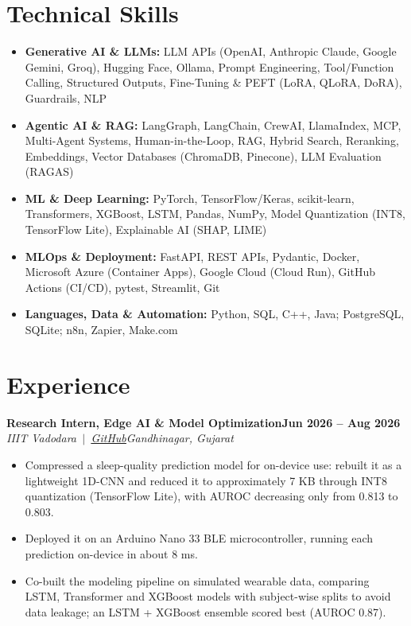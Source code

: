 \documentclass[10pt,a4paper]{article}
\newcommand{\entry}[4]{%
  \textbf{#1}\hfill\textbf{#2}\\
  \textit{#3}\hfill\textit{#4}\par}
\newcommand{\link}[2]{\href{#1}{\color{accent}\underline{#2}}}
\begin{document}
\section{Technical Skills}
\begin{itemize}[label={},leftmargin=0pt,itemsep=1pt]
  \item \textbf{Generative AI \& LLMs:} LLM APIs (OpenAI, Anthropic Claude, Google Gemini, Groq), Hugging Face, Ollama, Prompt Engineering, Tool/Function Calling, Structured Outputs, Fine-Tuning \& PEFT (LoRA, QLoRA, DoRA), Guardrails, NLP
  \item \textbf{Agentic AI \& RAG:} LangGraph, LangChain, CrewAI, LlamaIndex, MCP, Multi-Agent Systems, Human-in-the-Loop, RAG, Hybrid Search, Reranking, Embeddings, Vector Databases (ChromaDB, Pinecone), LLM Evaluation (RAGAS)
  \item \textbf{ML \& Deep Learning:} PyTorch, TensorFlow/Keras, scikit-learn, Transformers, XGBoost, LSTM, Pandas, NumPy, Model Quantization (INT8, TensorFlow Lite), Explainable AI (SHAP, LIME)
  \item \textbf{MLOps \& Deployment:} FastAPI, REST APIs, Pydantic, Docker, Microsoft Azure (Container Apps), Google Cloud (Cloud Run), GitHub Actions (CI/CD), pytest, Streamlit, Git
  \item \textbf{Languages, Data \& Automation:} Python, SQL, C++, Java; PostgreSQL, SQLite; n8n, Zapier, Make.com
\end{itemize}

\section{Experience}
\entry{Research Intern, Edge AI \& Model Optimization}{Jun 2026 -- Aug 2026}
      {IIIT Vadodara \,$|$\, \link{https://github.com/Siddhu-6/WASO_Sleep_Quality_Pred}{GitHub}}{Gandhinagar, Gujarat}
\begin{itemize}
  \item Compressed a sleep-quality prediction model for on-device use: rebuilt it as a lightweight 1D-CNN and reduced it to approximately 7 KB through INT8 quantization (TensorFlow Lite), with AUROC decreasing only from 0.813 to 0.803.
  \item Deployed it on an Arduino Nano 33 BLE microcontroller, running each prediction on-device in about 8 ms.
  \item Co-built the modeling pipeline on simulated wearable data, comparing LSTM, Transformer and XGBoost models with subject-wise splits to avoid data leakage; an LSTM + XGBoost ensemble scored best (AUROC 0.87).
\end{itemize}
\end{document}
